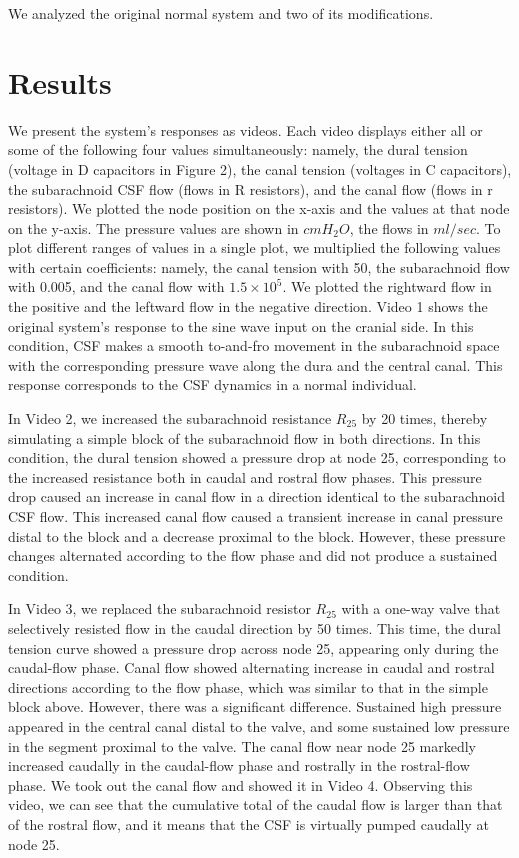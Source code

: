 \documentclass[fleqn,10pt]{wlscirep}
\begin{document}
We analyzed the original normal system and two of its modifications.

\section*{Results}

We present the system's responses as videos. Each video displays either all
or some of the following four values simultaneously: namely, the dural
tension (voltage in D capacitors in Figure 2), the canal tension (voltages
in C capacitors), the subarachnoid CSF flow (flows in R resistors), and the
canal flow (flows in r resistors). We plotted the node position on the
x-axis and the values at that node on the y-axis. The pressure values are
shown in $cmH_2O$, the flows in $ml/sec$. To plot different ranges of
values in a single plot, we multiplied the following values with certain
coefficients: namely, the canal tension with 50, the subarachnoid flow with
0.005, and the canal flow with $1.5\times10^{5}$. We plotted the
rightward flow in the positive and the leftward flow in the negative
direction.  Video 1 shows the original system's response to the sine wave
input on the cranial side. In this condition, CSF makes a smooth to-and-fro
movement in the subarachnoid space with the corresponding pressure wave
along the dura and the central canal. This response corresponds to the CSF
dynamics in a normal individual.

In Video 2, we increased the subarachnoid resistance $R_{25}$ by 20
times, thereby simulating a simple block of the subarachnoid flow in both
directions. In this condition, the dural tension showed a pressure drop at
node 25, corresponding to the increased resistance both in caudal and
rostral flow phases. This pressure drop caused an increase in canal flow in
a direction identical to the subarachnoid CSF flow. This increased canal
flow caused a transient increase in canal pressure distal to the block and
a decrease proximal to the block. However, these pressure changes
alternated according to the flow phase and did not produce a sustained
condition.

In Video 3, we replaced the subarachnoid resistor $R_{25}$
with a one-way valve that selectively resisted flow in the caudal direction
by 50 times. This time, the dural tension curve showed a pressure drop
across node 25, appearing only during the caudal-flow phase. Canal flow
showed alternating increase in caudal and rostral directions according to
the flow phase, which was similar to that in the simple block above.
However, there was a significant difference. Sustained high pressure
appeared in the central canal distal to the valve, and some sustained low
pressure in the segment proximal to the valve. The canal flow near node 25
markedly increased caudally in the caudal-flow phase and rostrally in the
rostral-flow phase. We took out the canal flow and showed it in Video 4.
Observing this video, we can see that the cumulative total of the caudal
flow is larger than that of the rostral flow, and it means that the CSF is
virtually pumped caudally at node 25. 
\end{document}
